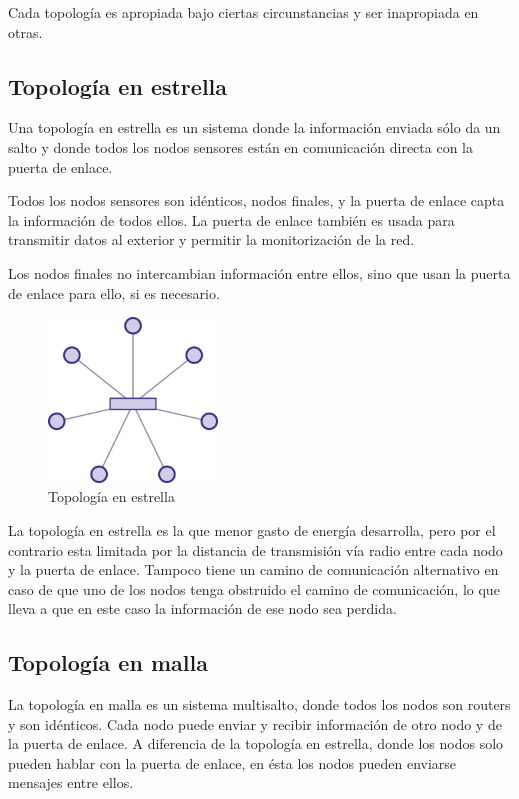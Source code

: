 Cada topolog\'ia es apropiada bajo ciertas circunstancias y ser inapropiada en otras. 

\subsection{Topolog\'ia en estrella}
Una topolog\'ia en estrella es un sistema donde la informaci\'on enviada s\'olo da un salto y donde todos los nodos sensores est\'an en comunicaci\'on directa con la puerta de enlace.

Todos los nodos sensores son id\'enticos, nodos finales, y la puerta de enlace capta la informaci\'on de todos ellos. La puerta de enlace tambi\'en es usada para transmitir datos al exterior y permitir la monitorizaci\'on de la red. 

Los nodos finales no intercambian informaci\'on entre ellos, sino que usan la puerta de enlace para ello, si es necesario.

\begin{figure}[htb]
    \centering
    \includegraphics[width=0.4\textwidth]{imagenes/estrella.png}
    \caption{Topología en estrella}
    \label{fig:top_estrella}
\end{figure}

La topolog\'ia en estrella es la que menor gasto de energ\'ia desarrolla, pero por el contrario esta limitada por la
distancia de transmisi\'on v\'ia radio entre cada nodo y la puerta de enlace. Tampoco tiene un camino de comunicaci\'on alternativo en caso de que uno de los nodos tenga obstruido el camino de comunicaci\'on, lo que lleva a que en este caso la informaci\'on de ese nodo sea perdida.


\subsection{Topolog\'ia en malla}
La topolog\'ia en malla es un sistema multisalto, donde todos los nodos son routers y son id\'enticos. Cada nodo puede enviar y recibir informaci\'on de otro nodo y de la puerta de enlace. A diferencia de la topolog\'ia en estrella, donde los nodos solo pueden hablar con la puerta de enlace, en \'esta los nodos pueden enviarse mensajes entre ellos. 

